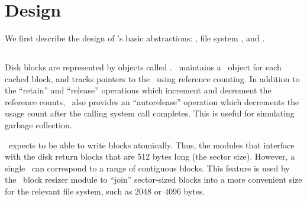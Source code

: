 \section{Design}
\label{sec:design}

We first describe the design of \Kudos's basic abstractions: \bdescs,
file system \modules, and \chdescs.

\subsection{\BDescs}

Disk blocks are represented by objects called \emph{\bdescs}. \Kudos\ maintains
a \bdesc\ object for each cached block, and tracks pointers to the \bdescs\
using reference counting. In addition to the ``retain'' and ``release''
operations which increment and decrement the reference counts, \Kudos\ also
provides an ``autorelease'' operation which decrements the usage count after the
calling system call completes. This is useful for simulating garbage collection.

\Kudos\ expects to be able to write blocks atomically. Thus, the modules that
interface with the disk return blocks that are 512 bytes long (the sector size).
However, a single \bdesc\ can correspond to a range of contiguous blocks. This
feature is used by the \Kudos\ block resizer module to ``join'' sector-sized
blocks into a more convenient size for the relevant file system, such as 2048 or
4096 bytes.


